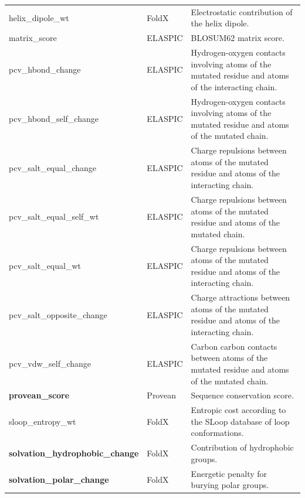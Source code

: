 \begin{table}[!htb]
\begin{tabular}{ l | l | p{7cm} }
		helix\_dipole\_wt                         & FoldX          & Electrostatic contribution of the helix dipole.                                                     \\
		matrix\_score                             & ELASPIC        & BLOSUM62 matrix score.                                                                              \\
		pcv\_hbond\_change                        & ELASPIC        & Hydrogen-oxygen contacts involving atoms of the mutated residue and atoms of the interacting chain. \\
		pcv\_hbond\_self\_change                  & ELASPIC        & Hydrogen-oxygen contacts involving atoms of the mutated residue and atoms of the mutated chain.     \\
		pcv\_salt\_equal\_change                  & ELASPIC        & Charge repulsions between atoms of the mutated residue and atoms of the interacting chain.          \\
		pcv\_salt\_equal\_self\_wt                & ELASPIC        & Charge repulsions between atoms of the mutated residue and atoms of the mutated chain.              \\
		pcv\_salt\_equal\_wt                      & ELASPIC        & Charge repulsions between atoms of the mutated residue and atoms of the interacting chain.          \\
		pcv\_salt\_opposite\_change               & ELASPIC        & Charge attractions between atoms of the mutated residue and atoms of the interacting chain.         \\
		pcv\_vdw\_self\_change                    & ELASPIC        & Carbon carbon contacts between atoms of the mutated residue and atoms of the mutated chain.         \\
		\textbf{provean\_score}                   & Provean        & Sequence conservation score.                                                                        \\
		sloop\_entropy\_wt                        & FoldX          & Entropic cost according to the SLoop database of loop conformations.                                \\
		\textbf{solvation\_hydrophobic\_change}   & FoldX          & Contribution of hydrophobic groups.                                                                 \\
		\textbf{solvation\_polar\_change}         & FoldX          & Energetic penalty for burying polar groups.                                                         \\

\end{tabular}
\end{table}
